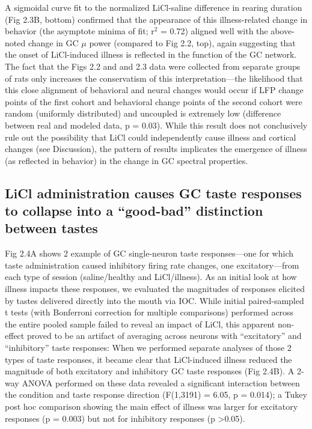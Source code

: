 \begin{refsection}
A sigmoidal curve fit to the normalized LiCl-saline difference in rearing duration (Fig 2.3B, bottom) confirmed that the appearance of this illness-related change in behavior (the asymptote minima of fit; r$^2$ = 0.72) aligned well with the above-noted change in GC \(\mu\) power (compared to Fig 2.2, top), again suggesting that the onset of LiCl-induced illness is reflected in the function of the GC network. The fact that the Figs 2.2 and and 2.3 data were collected from separate groups of rats only increases the conservatism of this interpretation—the likelihood that this close alignment of behavioral and neural changes would occur if LFP change points of the first cohort and behavioral change points of the second cohort were random (uniformly distributed) and uncoupled is extremely low (difference between real and modeled data, p = 0.03). While this result does not conclusively rule out the possibility that LiCl could independently cause illness and cortical changes (see Discussion), the pattern of results implicates the emergence of illness (as reflected in behavior) in the change in GC spectral properties.

\subsection{LiCl administration causes GC taste responses to collapse into a “good-bad” distinction between tastes}
Fig 2.4A shows 2 example of GC single-neuron taste responses—one for which taste administration caused inhibitory firing rate changes, one excitatory—from each type of session (saline/healthy and LiCl/illness). As an initial look at how illness impacts these responses, we evaluated the magnitudes of responses elicited by tastes delivered directly into the mouth via IOC. While initial paired-sampled t tests (with Bonferroni correction for multiple comparisons) performed across the entire pooled sample failed to reveal an impact of LiCl, this apparent non-effect proved to be an artifact of averaging across neurons with “excitatory” and “inhibitory” taste responses: When we performed separate analyses of those 2 types of taste responses, it became clear that LiCl-induced illness reduced the magnitude of both excitatory and inhibitory GC taste responses (Fig 2.4B). A 2-way ANOVA performed on these data revealed a significant interaction between the condition and taste response direction (F(1,3191) = 6.05, p = 0.014); a Tukey post hoc comparison showing the main effect of illness was larger for excitatory responses (p = 0.003) but not for inhibitory responses (p \textgreater 0.05).



\end{refsection}
